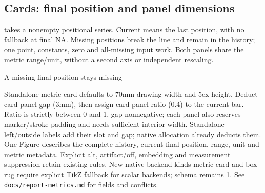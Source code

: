 \subsection{Cards: final position and panel dimensions}
 takes a nonempty positional series. Current means the last position, with no fallback at final NA. Missing positions break the line and remain in the history; one point, constants, zero and all-missing input work. Both panels share the metric range/unit, without a second axis or independent rescaling.
\begin{demo}{A missing final position stays missing}
\begingroup
{}
\begin{gradtable}[style=metric-report,width=\linewidth]
\end{gradtable}
\endgroup
\end{demo}
Standalone metric-card defaults to 70mm drawing width and 5ex height. Deduct card panel gap (3mm), then assign card panel ratio (0.4) to the current bar. Ratio is strictly between 0 and 1, gap nonnegative; each panel also reserves marker/stroke padding and needs sufficient interior width. Standalone left/outside labels add their slot and gap; native allocation already deducts them.
One Figure describes the complete history, current final position, range, unit and metric metadata. Explicit alt, artifact/off, embedding and measurement suppression retain existing rules. New native backend kinds metric-card and box-rug require explicit TikZ fallback for scalar backends; schema remains 1. See \texttt{docs/report-metrics.md} for fields and conflicts.
